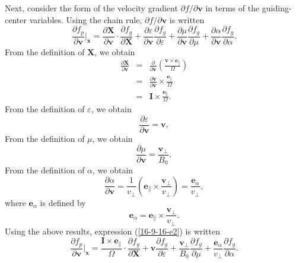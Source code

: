 \documentclass{article}
\newcommand{\nobracket}{}
\newcommand{\tmmathbf}[1]{\ensuremath{\boldsymbol{#1}}}
\begin{document}
Next, consider the form of the velocity gradient $\partial f / \partial
\mathbf{v}$ in terms of the guiding-center variables. Using the chain rule,
$\partial f / \partial \mathbf{v}$ is written
\begin{equation}
  \label{16-9-16-e2} \frac{\partial f_p}{\partial \mathbf{v}} |_{\mathbf{x}}
  \nobracket = \frac{\partial \mathbf{X}}{\partial \mathbf{v}} \cdot
  \frac{\partial f_g}{\partial \mathbf{X}} + \frac{\partial
  \varepsilon}{\partial \mathbf{v}}  \frac{\partial f_g}{\partial \varepsilon}
  + \frac{\partial \mu}{\partial \mathbf{v}}  \frac{\partial f_g}{\partial
  \mu} + \frac{\partial \alpha}{\partial \mathbf{v}}  \frac{\partial
  f_g}{\partial \alpha} .
\end{equation}
From the definition of $\mathbf{X}$, we obtain
\begin{eqnarray}
  \frac{\partial \mathbf{X}}{\partial \mathbf{v}} & = &
  \frac{\partial}{\partial \mathbf{v}} \left( \frac{\tmmathbf{v} \times
  \tmmathbf{e}_{\parallel}}{\Omega} \right) \nonumber\\
  & = &  \frac{\partial \mathbf{v}}{\partial \mathbf{v}} \times
  \frac{\tmmathbf{e}_{\parallel}}{\Omega} \nonumber\\
  & = & \mathbf{I} \times \frac{\tmmathbf{e}_{\parallel}}{\Omega} . 
\end{eqnarray}
From the definition of $\varepsilon$, we obtain
\begin{equation}
  \frac{\partial \varepsilon}{\partial \mathbf{v}} =\mathbf{v},
\end{equation}
From the definition of $\mu$, we obtain
\begin{equation}
  \frac{\partial \mu}{\partial \mathbf{v}} = \frac{\mathbf{v}_{\perp}}{B_0},
\end{equation}
From the definition of $\alpha$, we obtain
\begin{equation}
  \frac{\partial \alpha}{\partial \mathbf{v}} = \frac{1}{v_{\perp}} \left(
  \tmmathbf{e}_{\parallel} \times \frac{\mathbf{v}_{\perp}}{v_{\perp}} \right)
  = \frac{\tmmathbf{e}_{\alpha}}{v_{\perp}},
\end{equation}
where $\mathbf{e}_{\alpha}$ is defined by
\begin{equation}
  \tmmathbf{e}_{\alpha} = \tmmathbf{e}_{\parallel} \times
  \frac{\mathbf{v}_{\perp}}{v_{\perp}} .
\end{equation}
Using the above results, expression (\ref{16-9-16-e2}) is written
\begin{equation}
  \frac{\partial f_p}{\partial \mathbf{v}} |_{\mathbf{x}} \nobracket =
  \frac{\mathbf{I} \times \tmmathbf{e}_{\parallel}}{\Omega} \cdot
  \frac{\partial f_g}{\partial \mathbf{X}} +\mathbf{v} \frac{\partial
  f_g}{\partial \varepsilon} + \frac{\mathbf{v}_{\perp}}{B_0} \frac{\partial
  f_g}{\partial \mu} + \frac{\tmmathbf{e}_{\alpha}}{v_{\perp}}  \frac{\partial
  f_g}{\partial \alpha} .
\end{equation}
\end{document}

